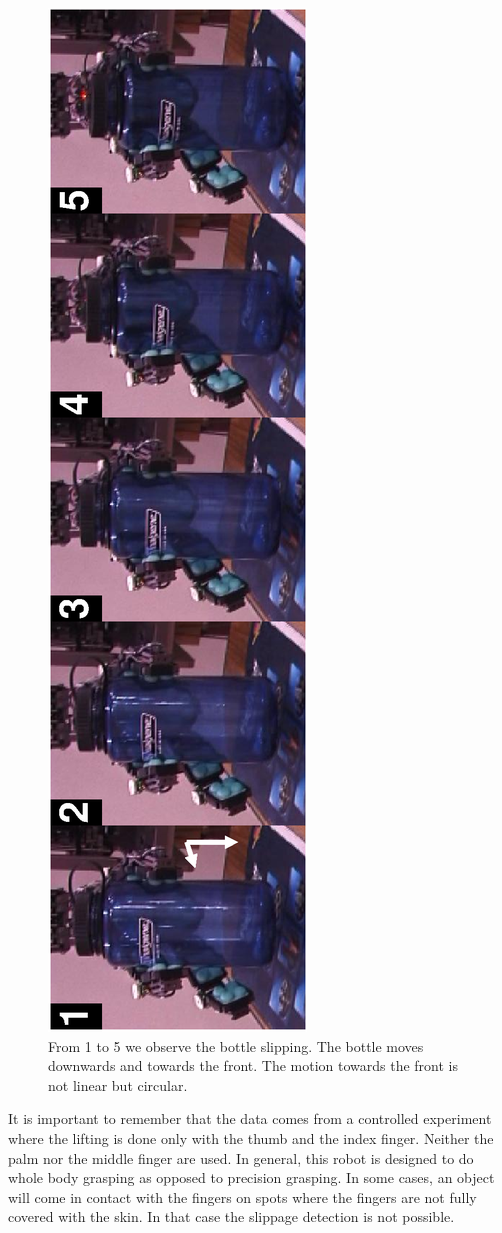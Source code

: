 \begin{figure}[htbp]
\centerline{
\includegraphics[height=\columnwidth, angle=270 ]{./figures/Slippage.eps}
} \caption[Bottle slipping]{From 1 to 5 we observe the bottle
slipping. The bottle moves downwards and towards the front. The
motion towards the front is not linear but circular.}
\label{fig:slipseq}
\end{figure}


It is important to remember that the data comes from a controlled
experiment where the lifting is done only with the thumb and the
index finger. Neither the palm nor the middle finger are used. In
general, this robot is designed to do whole body grasping as
opposed to precision grasping. In some cases, an object will come
in contact with the fingers on spots where the fingers are not
fully covered with the skin. In that case the slippage detection
is not possible.

